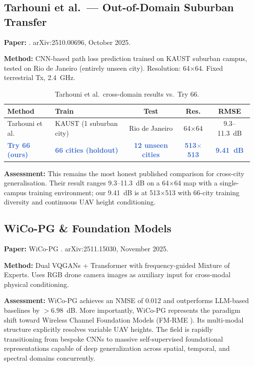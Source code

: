 \documentclass[11pt,a4paper]{article}
\newcommand{\ours}[1]{\textcolor{highlight}{\textbf{#1}}}
\begin{document}
\subsection{Tarhouni et al.\ --- Out-of-Domain Suburban Transfer}

\textbf{Paper:} \cite{tarhouni2025}. arXiv:2510.00696, October 2025.

\textbf{Method:} CNN-based path loss prediction trained on KAUST suburban campus, tested on Rio de Janeiro (entirely unseen city). Resolution: 64$\times$64. Fixed terrestrial Tx, 2.4~GHz.

\begin{table}[h!]
\centering
\caption{Tarhouni et al.\ cross-domain results vs.\ Try 66.}
\label{tab:tarhouni}
\begin{tabularx}{\textwidth}{lXccc}
\toprule
\textbf{Method} & \textbf{Train} & \textbf{Test} & \textbf{Res.} & \textbf{RMSE} \\
\midrule
Tarhouni et al. & KAUST (1 suburban city) & Rio de Janeiro & 64$\times$64 & 9.3--11.3~dB \\
\ours{Try 66 (ours)} & \ours{66 cities (holdout)} & \ours{12 unseen cities} & \ours{513$\times$513} & \ours{9.41~dB} \\
\bottomrule
\end{tabularx}
\end{table}

\textbf{Assessment:} This remains the most honest published comparison for cross-city generalisation. Their result ranges 9.3--11.3~dB on a 64$\times$64 map with a single-campus training environment; our 9.41~dB is at 513$\times$513 with 66-city training diversity and continuous UAV height conditioning.

\subsection{WiCo-PG \& Foundation Models}

\textbf{Paper:} WiCo-PG \cite{wicopg2025}. arXiv:2511.15030, November 2025.

\textbf{Method:} Dual VQGANs + Transformer with frequency-guided Mixture of Experts. Uses RGB drone camera images as auxiliary input for cross-modal physical conditioning.

\textbf{Assessment:} WiCo-PG achieves an NMSE of 0.012 and outperforms LLM-based baselines by $>$6.98~dB. More importantly, WiCo-PG represents the paradigm shift toward Wireless Channel Foundation Models (FM-RME \cite{fmrme2026}). Its multi-modal structure explicitly resolves variable UAV heights. The field is rapidly transitioning from bespoke CNNs to massive self-supervised foundational representations capable of deep generalization across spatial, temporal, and spectral domains concurrently.
\end{document}
